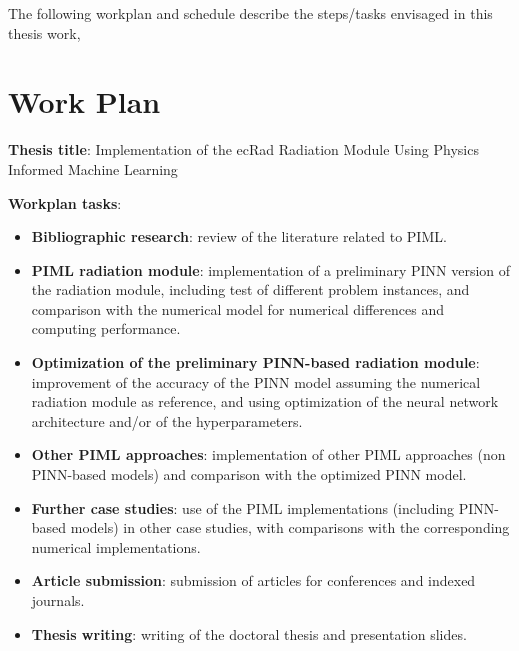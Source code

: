 The following workplan and schedule describe the steps/tasks envisaged in this thesis work,

 

\section{Work Plan}

\textbf{Thesis title}: Implementation of the ecRad Radiation Module Using Physics Informed Machine Learning

\textbf{Workplan tasks}:

\begin{itemize}[noitemsep,topsep=0pt]

\item \textbf{Bibliographic research}: review of the literature related to PIML.

\item \textbf{PIML radiation module}: implementation of a preliminary PINN version of the radiation module, including test of different problem instances, and comparison with the numerical model for numerical differences and computing performance.

\item \textbf{Optimization of the preliminary PINN-based radiation module}: improvement of the accuracy of the PINN model assuming the numerical radiation module as reference, and using optimization of the neural network architecture and/or of the hyperparameters.

\item \textbf{Other PIML approaches}: implementation of other PIML approaches (non PINN-based models) and comparison with the optimized PINN model.

\item \textbf{Further case studies}: use of the PIML implementations (including PINN-based models) in other case studies, with comparisons with the corresponding numerical implementations.


\item \textbf{Article submission}: submission of articles for conferences and indexed journals.


\item \textbf{Thesis writing}: writing of the doctoral thesis and presentation slides.

\end{itemize}



